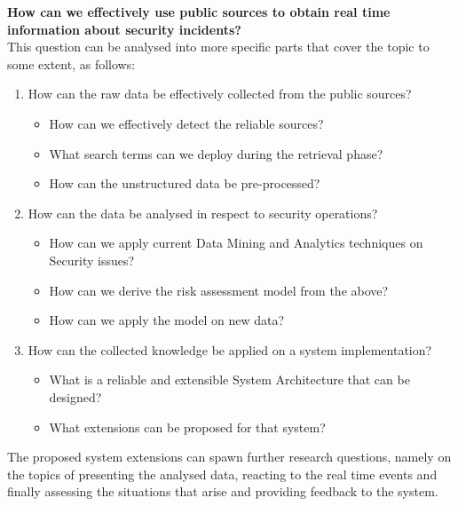 \documentclass[12pt]{article}
\begin{document}
\noindent
\textbf{How can we effectively use public sources to obtain real time information about security incidents?}\\[0.1cm]

\noindent
This question can be analysed into more specific parts that cover the topic to some extent, as follows:

\begin{enumerate}
	\item How can the raw data be effectively collected from the public sources? 
	\begin{itemize}
		\item How can we effectively detect the reliable sources?
		\item What search terms can we deploy during the retrieval phase?
		\item How can the unstructured data be pre-processed? 
	\end{itemize}
	\item How can the data be analysed in respect to security operations?
	\begin{itemize}
		\item How can we apply current Data Mining and Analytics techniques on Security issues?
		\item How can we derive the risk assessment model from the above?
		\item How can we apply the model on new data?
	\end{itemize}
	\item	How can the collected knowledge be applied on a system implementation?
	\begin{itemize}
		\item What is a reliable and extensible System Architecture that can be designed?
		\item What extensions can be proposed for that system?
	\end{itemize}
\end{enumerate}
\hfill \break 
The proposed system extensions can spawn further research questions, namely on the topics of presenting the analysed data, reacting to the real time events and finally assessing the situations that arise and providing feedback to the system.
\end{document}
